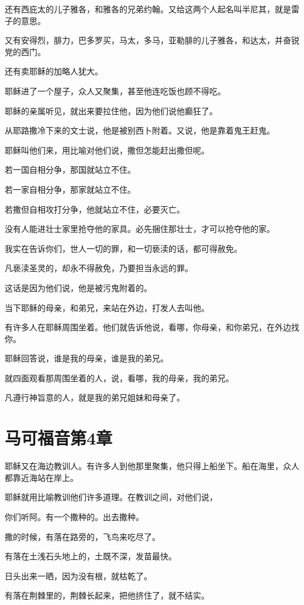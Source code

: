 \documentclass[12pt,oneside]{book}
\begin{document}
还有西庇太的儿子雅各，和雅各的兄弟约翰。又给这两个人起名叫半尼其，就是雷子的意思。

又有安得烈，腓力，巴多罗买，马太，多马，亚勒腓的儿子雅各，和达太，并奋锐党的西门。

还有卖耶稣的加略人犹大。

耶稣进了一个屋子，众人又聚集，甚至他连吃饭也顾不得吃。

耶稣的亲属听见，就出来要拉住他，因为他们说他癫狂了。

从耶路撒冷下来的文士说，他是被别西卜附着。又说，他是靠着鬼王赶鬼。

耶稣叫他们来，用比喻对他们说，撒但怎能赶出撒但呢。

若一国自相分争，那国就站立不住。

若一家自相分争，那家就站立不住。

若撒但自相攻打分争，他就站立不住，必要灭亡。

没有人能进壮士家里抢夺他的家具。必先捆住那壮士，才可以抢夺他的家。

我实在告诉你们，世人一切的罪，和一切亵渎的话，都可得赦免。

凡亵渎圣灵的，却永不得赦免，乃要担当永远的罪。

这话是因为他们说，他是被污鬼附着的。

当下耶稣的母亲，和弟兄，来站在外边，打发人去叫他。

有许多人在耶稣周围坐着。他们就告诉他说，看哪，你母亲，和你弟兄，在外边找你。

耶稣回答说，谁是我的母亲，谁是我的弟兄。

就四面观看那周围坐着的人，说，看哪，我的母亲，我的弟兄。

凡遵行神旨意的人，就是我的弟兄姐妹和母亲了。

\chapter{马可福音第4章}
耶稣又在海边教训人。有许多人到他那里聚集，他只得上船坐下。船在海里，众人都靠近海站在岸上。

耶稣就用比喻教训他们许多道理。在教训之间，对他们说，

你们听阿。有一个撒种的。出去撒种。

撒的时候，有落在路旁的，飞鸟来吃尽了。

有落在土浅石头地上的，土既不深，发苗最快。

日头出来一晒，因为没有根，就枯乾了。

有落在荆棘里的，荆棘长起来，把他挤住了，就不结实。
\end{document}
